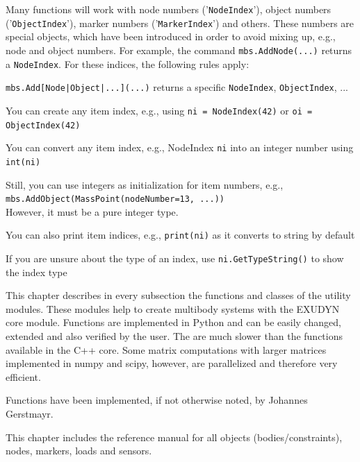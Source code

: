\documentclass[11pt,a4paper]{book} %
\begin{document}
Many functions will work with node numbers ('\texttt{NodeIndex}'), object numbers ('\texttt{ObjectIndex}'), marker numbers ('\texttt{MarkerIndex}') and others. These numbers are special objects, which have been introduced in order to avoid mixing up, e.g., node and object numbers.
For example, the command \texttt{mbs.AddNode(...)} returns a \texttt{NodeIndex}. For these indices, the following rules apply:
\bi
	\item \texttt{mbs.Add[Node|Object|...](...)} returns a specific \texttt{NodeIndex}, \texttt{ObjectIndex}, ...
	\item You can create any item index, e.g., using \texttt{ni = NodeIndex(42)} or \texttt{oi = ObjectIndex(42)}
	\item You can convert any item index, e.g., NodeIndex \texttt{ni} into an integer number using \texttt{int(ni)}
	\item Still, you can use integers as initialization for item numbers, e.g., \\
	      \texttt{mbs.AddObject(MassPoint(nodeNumber=13, ...))}\\
				However, it must be a pure integer type.
	\item You can also print item indices, e.g., \texttt{print(ni)} as it converts to string by default
	\item If you are unsure about the type of an index, use \texttt{ni.GetTypeString()} to show the index type
\ei



This chapter describes in every subsection the functions and classes of the utility modules. These modules help to create multibody systems with the EXUDYN core module. Functions are implemented in Python and can be easily changed, extended and also verified by the user. The are much slower than the functions available in the C++ core. Some matrix computations with larger matrices implemented in numpy and scipy, however, are parallelized and therefore very efficient.

Functions have been implemented, if not otherwise noted, by Johannes Gerstmayr.




 \label{sec_item_reference_manual}
This chapter includes the reference manual for all objects (bodies/constraints), nodes, markers, loads and sensors.
\end{document}
